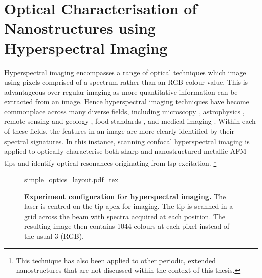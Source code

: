 \documentclass{article}
\begin{document}
\section{Optical Characterisation of Nanostructures using Hyperspectral Imaging}
\label{sec:hyperspectral_imaging}

Hyperspectral imaging encompasses a range of optical techniques which image using pixels comprised of a spectrum rather than an RGB colour value. This is advantageous over regular imaging as more quantitative information can be extracted from an image. Hence hyperspectral imaging techniques have become commonplace across many diverse fields, including microscopy \cite{schultz2001hyperspectral, leavesley2012hyperspectral}, astrophysics \cite{hege2004hyperspectral}, remote sensing and geology \cite{hackwell1996lwir, shaw2003spectral}, food standards \cite{kim2001hyperspectral, gowen2007hyperspectral}, and medical imaging \cite{vo2004hyperspectral, martin2006development, lu2014medical}. Within each of these fields, the features in an image are more clearly identified by their spectral signatures. In this instance, scanning confocal hyperspectral imaging is applied to optically characterise both sharp and nanostructured metallic AFM tips and identify optical resonances originating from \gls{lsp} excitation.%
\footnote{This technique has also been applied to other periodic, extended nanostructures that are not discussed within the context of this thesis.} %

\begin{figure}[bt]
\centering
\fontsize{10pt}{1em}\selectfont
\def\svgwidth{0.6\textwidth}
{simple_optics_layout.pdf_tex}
\caption[Experiment configuration for hyperspectral imaging]{\textbf{Experiment configuration for hyperspectral imaging.} The laser is centred on the tip apex for imaging. The tip is scanned in a grid across the beam with spectra acquired at each position. The resulting image then contains 1044 colours at each pixel instead of the usual 3 (RGB).}
\label{fig:simple_optics_layout}
\end{figure}
\end{document}
